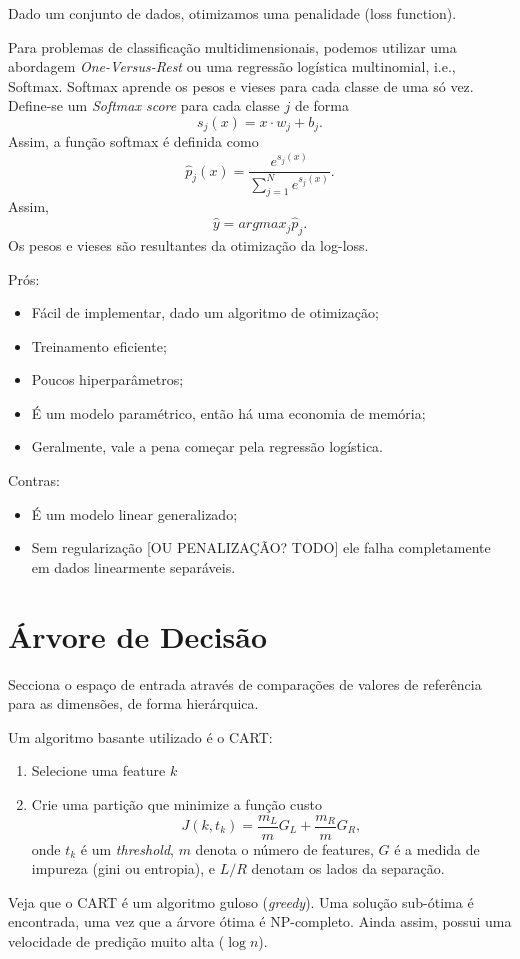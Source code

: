 Dado um conjunto de dados, otimizamos uma penalidade (loss function).

Para problemas de classificação multidimensionais, podemos utilizar uma abordagem \emph{One-Versus-Rest} ou uma regressão logística multinomial, i.e., Softmax. Softmax aprende os pesos e vieses para cada classe de uma só vez. Define-se um \emph{Softmax score} para cada classe $j$ de forma \[
    s_j(x) = x\cdot w_j + b_j
.\] Assim, a função softmax é definida como \[
\hat{p}_j(x) = \frac{e^{s_j(x)}}{\sum_{j=1}^{N} e^{s_j(x)}}
.\] Assim, \[
\hat{y} = arg max_j \hat{p}_j
.\] Os pesos e vieses são resultantes da otimização da log-loss.

Prós:
\begin{itemize}
    \item Fácil de implementar, dado um algoritmo de otimização;
    \item Treinamento eficiente;
    \item Poucos hiperparâmetros;
    \item É um modelo paramétrico, então há uma economia de memória;
    \item Geralmente, vale a pena começar pela regressão logística.
\end{itemize}
Contras:
\begin{itemize}
    \item É um modelo linear generalizado;
    \item Sem regularização [OU PENALIZAÇÃO? TODO] ele falha completamente em dados linearmente separáveis.
\end{itemize}

\section*{Árvore de Decisão}

Secciona o espaço de entrada através de comparações de valores de referência para as dimensões, de forma hierárquica.

Um algoritmo basante utilizado é o CART:
\begin{enumerate}
    \item Selecione uma feature $k$ 
    \item Crie uma partição que minimize a função custo \[
	    J(k, t_k) = \frac{m_L}{m}G_L + \frac{m_R}{m}G_R
	,\] onde $t_k$ é um \emph{threshold}, $m$ denota o número de features, $G$ é a medida de impureza (gini ou entropia), e $L/R$ denotam os lados da separação.
\end{enumerate}
Veja que o CART é um algoritmo guloso (\emph{greedy}). Uma solução sub-ótima é encontrada, uma vez que a árvore ótima é NP-completo. Ainda assim, possui uma velocidade de predição muito alta ($\log n$).

